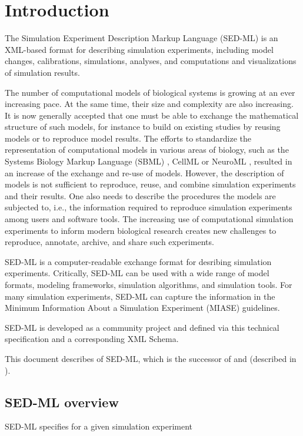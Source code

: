\chapter{Introduction}
The Simulation Experiment Description Markup Language (SED-ML) is an XML-based format for describing simulation experiments, including model changes, calibrations, simulations, analyses, and computations and visualizations of simulation results.

The number of computational models of biological systems is growing at an ever increasing pace.
At the same time, their size and complexity are also increasing. It is now generally accepted that one must be able to exchange the mathematical structure of such models, for instance to build on existing studies by reusing models or to reproduce model results. The efforts to standardize the representation of computational models in various areas of biology, such as the Systems Biology Markup Language (SBML) \citep{Hucka:2003}, CellML \citep{cuellar:2003} or NeuroML \citep{Goddard:2001}, resulted in an increase of the exchange and re-use of models. However, the description of models is not sufficient to reproduce, reuse, and combine simulation experiments and their results. One also needs to describe the procedures the models are subjected to, i.e., the information required to reproduce simulation experiments among users and software tools. The increasing use of computational simulation experiments to inform modern biological research creates new challenges to reproduce, annotate, archive, and share such experiments.

SED-ML is a computer-readable exchange format for desribing simulation experiments. Critically, SED-ML can be used with a wide range of model formats, modeling frameworks, simulation algorithms, and simulation tools. For many simulation experiments, SED-ML can capture the information in the Minimum Information About a Simulation Experiment (MIASE) \citep{Waltemath:2011} guidelines.

SED-ML is developed as a community project and defined via this technical specification and a corresponding XML Schema. 

This document describes \currentLV of SED-ML, which is the successor of \previousLV and \LoneVone (described in \citep{WAB+11}).

\section{SED-ML overview}
SED-ML specifies for a given simulation experiment

